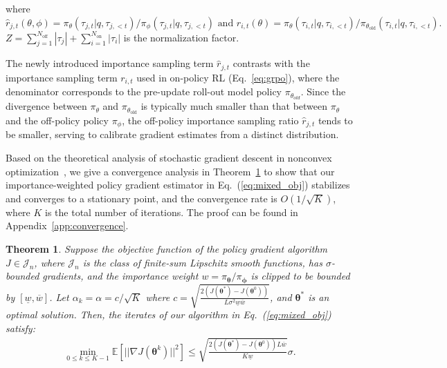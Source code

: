 \documentclass{article}
\newtheorem{theorem}{Theorem}
\begin{document}
where $\hat{r}_{j,t}(\theta, \phi) = {\pi_{\theta}(\tau_{j,t} | q, \tau_{j,<t})}/{\pi_{\phi}(\tau_{j,t} | q, \tau_{j,<t})} \text{ and }{r_{i,t}(\theta) = {\pi_\theta(\tau_{i,t} | q, \tau_{i,<t})}/{\pi_{\theta_{\text{old}}}(\tau_{i,t} | q, \tau_{i,<t})}}.$
$Z=\sum_{j=1}^{N_{\text{off}}} {|\tau_j|}+\sum_{i=1}^{N_{\text{on}}} {|\tau_i|}$ is the normalization factor. 


The newly introduced importance sampling term $\hat{r}_{j,t}$ contrasts with the importance sampling term $r_{i,t}$ used in on-policy RL (Eq.~\ref{eq:grpo}), where the denominator corresponds to the pre-update roll-out model policy $\pi_{\theta_{old}}$.
Since the divergence between $\pi_{\theta}$ and $\pi_{\theta_{\text{old}}}$ is typically much smaller than that between $\pi_{\theta}$ and the off-policy policy $\pi_{\phi}$, the off-policy importance sampling ratio $\hat{r}_{j,t}$ tends to be smaller, serving to calibrate gradient estimates from a distinct distribution.


Based on the theoretical analysis of stochastic gradient descent in nonconvex optimization~\cite{reddi2016stochastic}, we give a convergence analysis in Theorem~\ref{thm:convergence} to show that our importance-weighted policy gradient estimator in Eq.~(\ref{eq:mixed_obj}) stabilizes and converges to a stationary point, and the convergence rate is $O(1/\sqrt{K})$, where $K$ is the total number of iterations. The proof can be found in Appendix~\ref{app:convergence}.


\setcounter{theorem}{0}
\begin{theorem}\label{thm:convergence}
Suppose the objective function of the policy gradient algorithm $J\in\mathcal{J}_n$, where $\mathcal{J}_n$ is the class of finite-sum Lipschitz smooth functions, has $\sigma$-bounded gradients, and the importance weight $w=\pi_{\bm{\theta}}/\pi_{\bm{\phi}}$ is clipped to be bounded by $[\underline{w}, \overline{w}]$.
Let $\alpha_k=\alpha=c/\sqrt{K}$ where $c = \sqrt{\frac{2(J(\bm{\theta}^*)-J(\bm{\theta}^0))}{L\sigma^2\underline{w}\overline{w}}}$, and $\bm{\theta}^*$ is an optimal solution. 
Then, the iterates of our algorithm in Eq.~(\ref{eq:mixed_obj}) satisfy:
\begin{eqnarray}
\min_{0\le k\le K-1}\mathbb{E}[||\nabla J(\bm{\theta}^k)||^2] \le \sqrt{\frac{2(J(\bm{\theta}^*)-J(\bm{\theta}^0))L\overline{w}}{K\underline{w}}}\sigma. \nonumber
\end{eqnarray}
\end{theorem}
\end{document}
